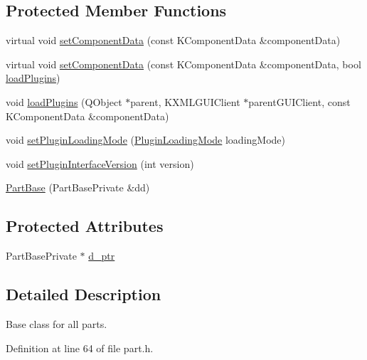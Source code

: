 \subsection*{\-Protected \-Member \-Functions}
\begin{DoxyCompactItemize}
\item 
virtual void \hyperlink{classKParts_1_1PartBase_a5542df2a60d5ed1882bf31ac89d9a8fe}{set\-Component\-Data} (const \-K\-Component\-Data \&component\-Data)
\item 
virtual void \hyperlink{classKParts_1_1PartBase_af8ef8d076e01eda7b03fadca80b41afc}{set\-Component\-Data} (const \-K\-Component\-Data \&component\-Data, bool \hyperlink{classKParts_1_1PartBase_aca02ff148518a56d98a1fc8e96d7f637}{load\-Plugins})
\item 
void \hyperlink{classKParts_1_1PartBase_aca02ff148518a56d98a1fc8e96d7f637}{load\-Plugins} (\-Q\-Object $\ast$parent, \-K\-X\-M\-L\-G\-U\-I\-Client $\ast$parent\-G\-U\-I\-Client, const \-K\-Component\-Data \&component\-Data)
\item 
void \hyperlink{classKParts_1_1PartBase_abaf6f9e33fa1890008905f9a1356e1a1}{set\-Plugin\-Loading\-Mode} (\hyperlink{classKParts_1_1PartBase_a73b04eba759c3505ac722b2ceaaa8b76}{\-Plugin\-Loading\-Mode} loading\-Mode)
\item 
void \hyperlink{classKParts_1_1PartBase_a5a9ed59560edb848e787c4b3cee878b1}{set\-Plugin\-Interface\-Version} (int version)
\item 
\hyperlink{classKParts_1_1PartBase_acf7602b6a274df3a055ef39dcda3b6ed}{\-Part\-Base} (\-Part\-Base\-Private \&dd)
\end{DoxyCompactItemize}
\subsection*{\-Protected \-Attributes}
\begin{DoxyCompactItemize}
\item 
\-Part\-Base\-Private $\ast$ \hyperlink{classKParts_1_1PartBase_a5655e19a6338ea12c0e0a92956277e08}{d\-\_\-ptr}
\end{DoxyCompactItemize}


\subsection{\-Detailed \-Description}
\-Base class for all parts. 

\-Definition at line 64 of file part.\-h.



